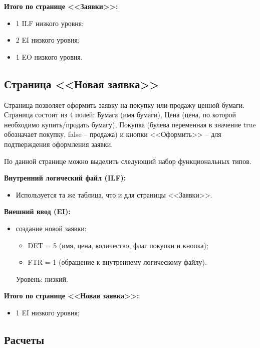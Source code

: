 \textbf{Итого по странице <<Заявки>>:}

\begin{itemize}
    \item 1 ILF низкого уровня;
    \item 2 EI низкого уровня;
    \item 1 EO низкого уровня.
\end{itemize}


\subsection{Страница <<Новая заявка>>}


Страница позволяет оформить заявку на покупку или продажу ценной бумаги. Страница состоит из 4 полей: Бумага (имя бумаги), Цена (цена, по которой необходимо купить/продать бумагу), Покупка (булева переменная в значение true обозначает покупку, false -- продажа) и кнопки <<Оформить>> -- для подтверждения оформления заявки.

По данной странице можно выделить следующий набор функциональных типов.


\textbf{Внутренний логический файл (ILF):}

\begin{itemize}
    \item Используется та же таблица, что и для страницы <<Заявки>>.
\end{itemize}

\textbf{Внешний ввод (EI):}

\begin{itemize}
    \item создание новой заявки:
    \begin{itemize}
        \item DET = 5 (имя, цена, количество, флаг покупки и кнопка);
        \item FTR = 1 (обращение к внутреннему логическому файлу).
    \end{itemize}
    Уровень: низкий.
\end{itemize}

\textbf{Итого по странице <<Новая заявка>>:}

\begin{itemize}
    \item 1 EI низкого уровня;
\end{itemize}


\subsection{Расчеты}

